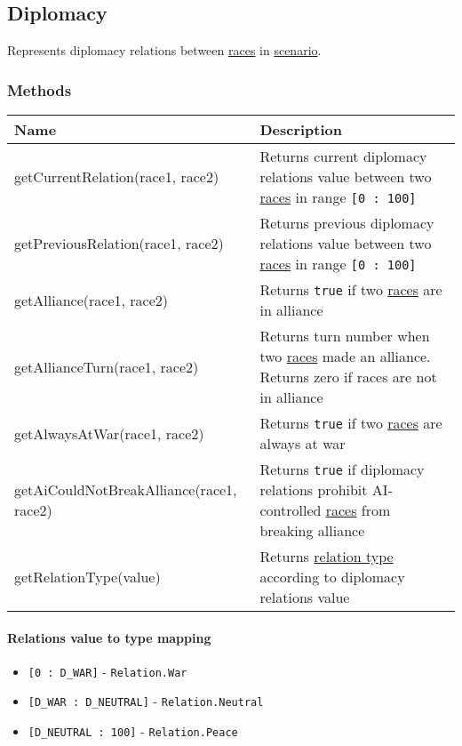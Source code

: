 \subsection{Diplomacy}
\label{Diplomacy}
Represents diplomacy relations between \hyperref[RaceCategory]{races} in \hyperref[Scenario]{scenario}.
\subsubsection{Methods}
\begin{center}
\begin{tabularx}{\linewidth}{| l | X |}
\hline
\textbf{Name} & \textbf{Description} \\
\hline
getCurrentRelation(race1, race2) & Returns current diplomacy relations value between two \hyperref[RaceCategory]{races} in range \texttt{[0 : 100]}\\
\hline
getPreviousRelation(race1, race2) & Returns previous diplomacy relations value between two \hyperref[RaceCategory]{races} in range \texttt{[0 : 100]}\\
\hline
getAlliance(race1, race2) & Returns \texttt{true} if two \hyperref[RaceCategory]{races} are in alliance\\
\hline
getAllianceTurn(race1, race2) & Returns turn number when two \hyperref[RaceCategory]{races} made an alliance. Returns zero if races are not in alliance\\
\hline
getAlwaysAtWar(race1, race2) & Returns \texttt{true} if two \hyperref[RaceCategory]{races} are always at war\\
\hline
getAiCouldNotBreakAlliance(race1, race2) & Returns \texttt{true} if diplomacy relations prohibit AI-controlled \hyperref[RaceCategory]{races} from breaking alliance\\
\hline
getRelationType(value) & Returns \hyperref[Relation]{relation type} according to diplomacy relations value\\
\hline
\end{tabularx}
\end{center}
\paragraph{Relations value to type mapping}
\begin{itemize}
\item \texttt{[0 : D\_WAR]} - \texttt{Relation.War}
\item \texttt{[D\_WAR : D\_NEUTRAL]} - \texttt{Relation.Neutral}
\item \texttt{[D\_NEUTRAL : 100]} - \texttt{Relation.Peace}
\end{itemize}
